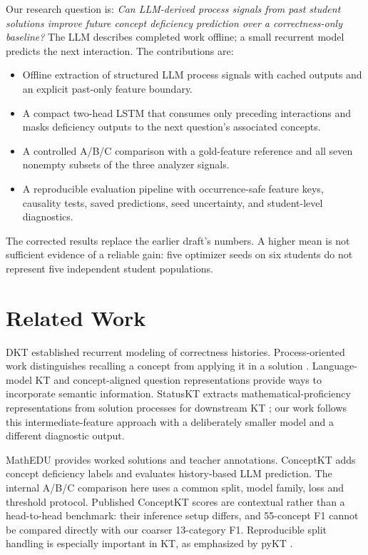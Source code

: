 \documentclass[11pt]{article}
\begin{document}
Our research question is: \emph{Can LLM-derived process signals from past student solutions improve future concept deficiency prediction over a correctness-only baseline?} The LLM describes completed work offline; a small recurrent model predicts the next interaction. The contributions are:
\begin{itemize}[leftmargin=1.4em,itemsep=2pt]
\item Offline extraction of structured LLM process signals with cached outputs and an explicit past-only feature boundary.
\item A compact two-head LSTM that consumes only preceding interactions and masks deficiency outputs to the next question's associated concepts.
\item A controlled A/B/C comparison with a gold-feature reference and all seven nonempty subsets of the three analyzer signals.
\item A reproducible evaluation pipeline with occurrence-safe feature keys, causality tests, saved predictions, seed uncertainty, and student-level diagnostics.
\end{itemize}
The corrected results replace the earlier draft's numbers. A higher mean is not sufficient evidence of a reliable gain: five optimizer seeds on six students do not represent five independent student populations.

\section{Related Work}
DKT \cite{piech2015dkt} established recurrent modeling of correctness histories. Process-oriented work distinguishes recalling a concept from applying it in a solution \cite{huang2024remembering}. Language-model KT \cite{lee2024lkt} and concept-aligned question representations \cite{ozyurt2024kcqrl} provide ways to incorporate semantic information. StatusKT extracts mathematical-proficiency representations from solution processes for downstream KT \cite{park2025statuskt}; our work follows this intermediate-feature approach with a deliberately smaller model and a different diagnostic output.

MathEDU \cite{hsu2026mathedu} provides worked solutions and teacher annotations. ConceptKT \cite{kang2026conceptkt} adds concept deficiency labels and evaluates history-based LLM prediction. The internal A/B/C comparison here uses a common split, model family, loss and threshold protocol. Published ConceptKT scores are contextual rather than a head-to-head benchmark: their inference setup differs, and 55-concept F1 cannot be compared directly with our coarser 13-category F1. Reproducible split handling is especially important in KT, as emphasized by pyKT \cite{liu2022pykt}.
\end{document}
